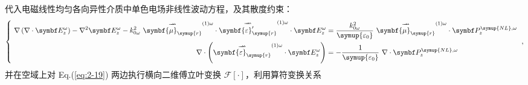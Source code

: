 代入电磁线性均匀各向异性介质中单色电场非线性波动方程，及其散度约束：
\begin{equation} \label{eq:2-19}
	\left\{\ \begin{aligned} \nabla \left( \nabla \cdot \symbf E^{\omega}_z \right) - \nabla^2 \symbf E^{\omega}_z - k^{2}_{0\omega}\ \overset{\rightharpoonup\!\!\!\! \rightharpoonup}{\symbf{\mu}_{\symup{r}}}^{(1)\omega} \cdot \overset{\rightharpoonup\!\!\!\! \rightharpoonup}{\symbf{\varepsilon}'_{\symup{r}}}^{(1)\omega} \cdot \symbf E^{\omega}_z &= \frac{k^{2}_{0\omega}}{{\symup{\varepsilon_0}}}\ \overset{\rightharpoonup\!\!\!\! \rightharpoonup}{\symbf{\mu}_{\symup{r}}}^{(1)\omega} \cdot \symbf P^{{\symup{NL}},\omega}_z \\ \nabla \cdot \left( \overset{\rightharpoonup\!\!\!\! \rightharpoonup}{\symbf{\varepsilon}_{\symup{r}}}^{(1)\omega} \cdot \symbf E^{\omega}_z \right) &= - \displaystyle{ \frac{1}{{\symup{\varepsilon_0}}} }\ \nabla \cdot \symbf P^{{\symup{NL}},\omega}_z \end{aligned}\right. ~,
\end{equation}
并在空域上对 Eq.(\ref{eq:2-19}) 两边执行横向二维傅立叶变换 $\mathcal F \left[ \cdot \right]$，利用算符变换关系
